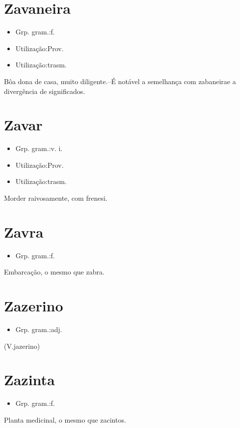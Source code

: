 \section{Zavaneira}
\begin{itemize}
\item {Grp. gram.:f.}
\end{itemize}
\begin{itemize}
\item {Utilização:Prov.}
\end{itemize}
\begin{itemize}
\item {Utilização:trasm.}
\end{itemize}
Bôa dona de casa, muito diligente.--É notável a semelhança com \textunderscore zabaneira\textunderscore  e a divergência de significados.
\section{Zavar}
\begin{itemize}
\item {Grp. gram.:v. i.}
\end{itemize}
\begin{itemize}
\item {Utilização:Prov.}
\end{itemize}
\begin{itemize}
\item {Utilização:trasm.}
\end{itemize}
Morder raivosamente, com frenesi.
\section{Zavra}
\begin{itemize}
\item {Grp. gram.:f.}
\end{itemize}
Embarcação, o mesmo que \textunderscore zabra\textunderscore .
\section{Zazerino}
\begin{itemize}
\item {Grp. gram.:adj.}
\end{itemize}
(V.jazerino)
\section{Zazinta}
\begin{itemize}
\item {Grp. gram.:f.}
\end{itemize}
Planta medicinal, o mesmo que \textunderscore zacintos\textunderscore .
